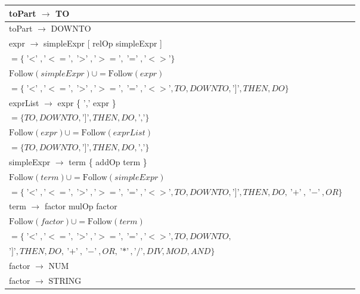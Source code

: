 \documentclass[8pt]{scrartcl}
\newcommand{\First}[1]{\mathrm{First}(#1)}
\newcommand{\Follow}[1]{\mathrm{Follow}(#1)}
\newcommand{\epsset}{\{\varepsilon\}}
\begin{document}
\begin{itemize}
\begin{tabular}{|l|l|}
                \hline
                toPart $\rightarrow$ TO & \\
                \hline
                toPart $\rightarrow$ DOWNTO & \\
                \hline
                expr $\rightarrow$ simpleExpr [ relOp simpleExpr ] & \makecell[l]{$\Follow{simpleExpr} \cup = \First{relOp} \setminus \epsset $\\ $= \{\text{'$<$'}, \text{'$<=$'}, \text{'$>$'}, \text{'$>=$'}, \text{'$=$'}, \text{'$<>$'}\}$\\ $\Follow{simpleExpr} \cup = \Follow{expr} $\\ $= \{\text{'$<$'}, \text{'$<=$'}, \text{'$>$'}, \text{'$>=$'}, \text{'$=$'}, \text{'$<>$'}, TO, DOWNTO, \text{'$]$'}, THEN, DO\}$}\\
                \hline
                exprList $\rightarrow$ expr \{ ',' expr \} & \makecell[l]{$\Follow{expr} \cup = \First{\text{','}} \setminus \epsset $\\ $= \{TO, DOWNTO, \text{']'}, THEN, DO, \text{','}\}$\\ $\Follow{expr} \cup = \Follow{exprList} $\\ $= \{TO, DOWNTO, \text{']'}, THEN, DO, \text{','}\}$}\\
                \hline
                simpleExpr $\rightarrow$ term \{ addOp term \} & \makecell[l]{$\Follow{term} \cup = \First{addOp} \setminus \epsset = \{\text{'$+$'}, \text{'$-$'}, OR\}$\\ $\Follow{term} \cup = \Follow{simpleExpr} $\\ $= \{\text{'$<$'}, \text{'$<=$'}, \text{'$>$'}, \text{'$>=$'}, \text{'$=$'}, \text{'$<>$'}, TO, DOWNTO, \text{'$]$'}, THEN, DO, \text{'$+$'}, \text{'$-$'}, OR\}$}\\
                \hline
                term $\rightarrow$ factor { mulOp factor } & \makecell[l]{$\Follow{factor} \cup = \First{mulOp} \setminus \epsset = \{\text{'$*$'}, \text{'$/$'}, DIV, MOD, AND\}$\\$\Follow{factor} \cup = \Follow{term} $\\ $= \{\text{'$<$'}, \text{'$<=$'}, \text{'$>$'}, \text{'$>=$'}, \text{'$=$'}, \text{'$<>$'}, TO, DOWNTO,$\\$ \text{'$]$'}, THEN, DO, \text{'$+$'}, \text{'$-$'}, OR, \text{'$*$'}, \text{'$/$'}, DIV, MOD, AND\}$}\\
                \hline
                factor $\rightarrow$ NUM &\\
                \hline
                factor $\rightarrow$ STRING &\\

\end{tabular}
\end{itemize}
\end{document}
